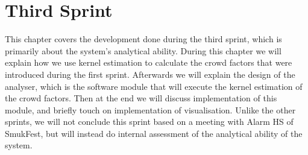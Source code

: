\chapter{Third Sprint}\label{ch:sprint3}

This chapter covers the development done during the third sprint, which is primarily about the system's analytical ability. During this chapter we will explain how we use kernel estimation to calculate the crowd factors that were introduced during the first sprint. Afterwards we will explain the design of the analyser, which is the software module that will execute the kernel estimation of the crowd factors. Then at the end we will discuss implementation of this module, and briefly touch on implementation of visualisation. Unlike the other sprints, we will not conclude this sprint based on a meeting with Alarm HS of SmukFest, but will instead do internal assessment of the analytical ability of the system.









